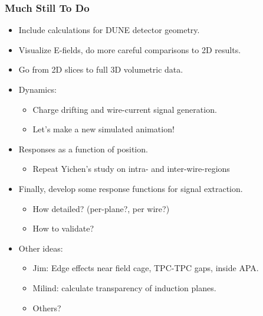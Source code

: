 \documentclass[xcolor=dvipsnames]{beamer}
\begin{document}
\begin{frame}
  \frametitle{Much Still To Do}

  \begin{itemize}
  \item Include calculations for DUNE detector geometry.
  \item Visualize E-fields, do more careful comparisons to 2D
    results.
  \item Go from 2D slices to full 3D volumetric data.
  \item Dynamics:
    \begin{itemize}\footnotesize
    \item Charge drifting and wire-current signal generation.
    \item Let's make a new simulated animation!
    \end{itemize}
  \item Responses as a function of position.
    \begin{itemize}\footnotesize
    \item Repeat Yichen's study on intra- and inter-wire-regions
    \end{itemize}
  \item Finally, develop some response functions for signal extraction.  
    \begin{itemize}\footnotesize
    \item How detailed? (per-plane?, per wire?)
    \item How to validate?
    \end{itemize}
  \item Other ideas:
    \begin{itemize}\footnotesize
    \item Jim: Edge effects near field cage, TPC-TPC gaps, inside APA.
    \item Milind: calculate transparency of induction planes.
    \item Others?
    \end{itemize}
  \end{itemize}

\end{frame}
\end{document}

